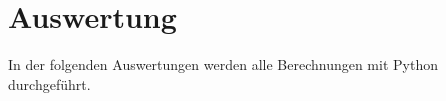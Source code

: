 \section{Auswertung}

In der folgenden Auswertungen werden alle Berechnungen mit Python durchgeführt.


